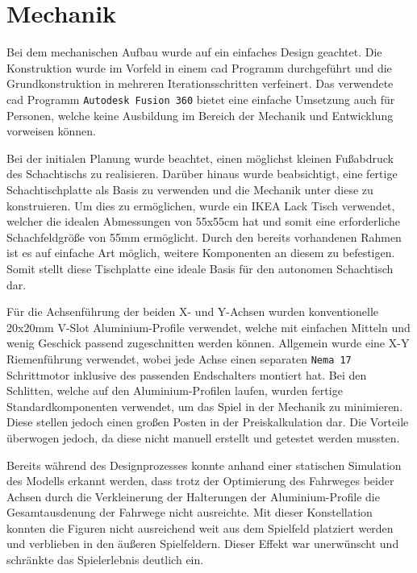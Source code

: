 \hypertarget{mechanik}{%
\section{Mechanik}\label{mechanik}}

Bei dem mechanischen Aufbau wurde auf ein einfaches Design geachtet. Die
Konstruktion wurde im Vorfeld in einem \gls{cad} Programm durchgeführt
und die Grundkonstruktion in mehreren Iterationsschritten verfeinert.
Das verwendete \gls{cad} Programm
\passthrough{\lstinline!Autodesk Fusion 360!} bietet eine einfache
Umsetzung auch für Personen, welche keine Ausbildung im Bereich der
Mechanik und Entwicklung vorweisen können.

Bei der initialen Planung wurde beachtet, einen möglichst kleinen
Fußabdruck des Schachtischs zu realisieren. Darüber hinaus wurde
beabsichtigt, eine fertige Schachtischplatte als Basis zu verwenden und
die Mechanik unter diese zu konstruieren. Um dies zu ermöglichen, wurde
ein IKEA Lack Tisch verwendet, welcher die idealen Abmessungen von
55x55cm hat und somit eine erforderliche Schachfeldgröße von 55mm
ermöglicht. Durch den bereits vorhandenen Rahmen ist es auf einfache Art
möglich, weitere Komponenten an diesem zu befestigen. Somit stellt diese
Tischplatte eine ideale Basis für den autonomen Schachtisch dar.

Für die Achsenführung der beiden X- und Y-Achsen wurden konventionelle
20x20mm V-Slot Aluminium-Profile verwendet, welche mit einfachen Mitteln
und wenig Geschick passend zugeschnitten werden können. Allgemein wurde
eine X-Y Riemenführung verwendet, wobei jede Achse einen separaten
\passthrough{\lstinline!Nema 17!} Schrittmotor inklusive des passenden
Endschalters montiert hat. Bei den Schlitten, welche auf den
Aluminium-Profilen laufen, wurden fertige Standardkomponenten verwendet,
um das Spiel in der Mechanik zu minimieren. Diese stellen jedoch einen
großen Posten in der Preiskalkulation dar. Die Vorteile überwogen
jedoch, da diese nicht manuell erstellt und getestet werden mussten.

Bereits während des Designprozesses konnte anhand einer statischen
Simulation des Modells erkannt werden, dass trotz der Optimierung des
Fahrweges beider Achsen durch die Verkleinerung der Halterungen der
Aluminium-Profile die Gesamtausdenung der Fahrwege nicht ausreichte. Mit
dieser Konstellation konnten die Figuren nicht ausreichend weit aus dem
Spielfeld platziert werden und verblieben in den äußeren Spielfeldern.
Dieser Effekt war unerwünscht und schränkte das Spielerlebnis deutlich
ein.

